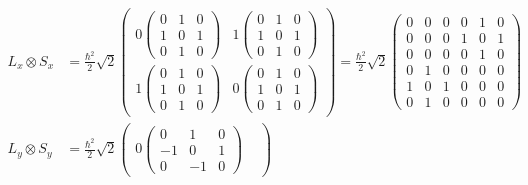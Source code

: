 \documentclass[a4paper,german,12pt,smallheadings]{scrartcl}
\begin{document}
\begin{enumerate}[a)]
    \begin{align*}
      L_x \otimes S_x &= \frac{\hbar^2}{2} \sqrt{2}
        \begin{pmatrix}
          0
            \begin{pmatrix}
              0 & 1 & 0 \\
              1 & 0 & 1 \\
              0 & 1 & 0
            \end{pmatrix}
           &
          1
            \begin{pmatrix}
              0 & 1 & 0 \\
              1 & 0 & 1 \\
              0 & 1 & 0
            \end{pmatrix}
            \\
          1
            \begin{pmatrix}
              0 & 1 & 0 \\
              1 & 0 & 1 \\
              0 & 1 & 0
            \end{pmatrix}
           &
          0
            \begin{pmatrix}
              0 & 1 & 0 \\
              1 & 0 & 1 \\
              0 & 1 & 0
            \end{pmatrix}
          \end{pmatrix}
          =
          \frac{\hbar^2}{2} \sqrt{2}
          \begin{pmatrix}
            0 & 0 & 0 & 0 & 1 & 0 \\
            0 & 0 & 0 & 1 & 0 & 1 \\
            0 & 0 & 0 & 0 & 1 & 0 \\
            0 & 1 & 0 & 0 & 0 & 0 \\
            1 & 0 & 1 & 0 & 0 & 0 \\
            0 & 1 & 0 & 0 & 0 & 0
          \end{pmatrix} \\
      L_y \otimes S_y &= \frac{\hbar^2}{2} \sqrt{2}
        \begin{pmatrix}
          0
            \begin{pmatrix}
              0 & 1 & 0 \\
              -1 & 0 & 1 \\
              0 & -1 & 0
            \end{pmatrix}
           &

\end{pmatrix}
\end{align*}
\end{enumerate}
\end{document}
